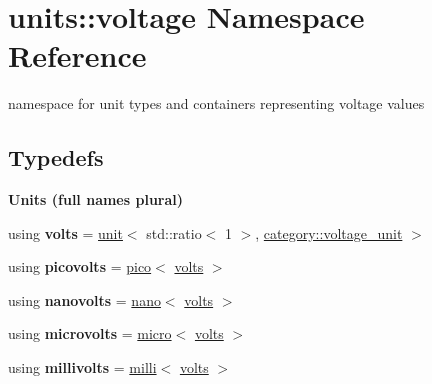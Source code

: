 \hypertarget{namespaceunits_1_1voltage}{}\section{units\+:\+:voltage Namespace Reference}
\label{namespaceunits_1_1voltage}


namespace for unit types and containers representing voltage values  


\subsection*{Typedefs}
\begin{Indent}{\bf Units (full names plural)}\par
\begin{DoxyCompactItemize}
\item 
\hypertarget{namespaceunits_1_1voltage_adbd9a06b5710d75a99702d13573fb1af}{}using {\bfseries volts} = \hyperlink{structunits_1_1unit}{unit}$<$ std\+::ratio$<$ 1 $>$, \hyperlink{namespaceunits_1_1category_aaac5d18aab461c59602bf8f07861d26e}{category\+::voltage\+\_\+unit} $>$\label{namespaceunits_1_1voltage_adbd9a06b5710d75a99702d13573fb1af}

\item 
\hypertarget{namespaceunits_1_1voltage_a30934f2b50c35efb7ee652d176eefb21}{}using {\bfseries picovolts} = \hyperlink{group___unit_manipulators_ga82a8d14a3e0877a375a66b64c45baab9}{pico}$<$ \hyperlink{structunits_1_1unit}{volts} $>$\label{namespaceunits_1_1voltage_a30934f2b50c35efb7ee652d176eefb21}

\item 
\hypertarget{namespaceunits_1_1voltage_a5a7751d72cfc6db625b51e7185881b21}{}using {\bfseries nanovolts} = \hyperlink{group___unit_manipulators_ga1c25c3c1d6c1f3aed3fd1ecf043110d5}{nano}$<$ \hyperlink{structunits_1_1unit}{volts} $>$\label{namespaceunits_1_1voltage_a5a7751d72cfc6db625b51e7185881b21}

\item 
\hypertarget{namespaceunits_1_1voltage_ab0ecad7cf9926495c5bf8058748719d6}{}using {\bfseries microvolts} = \hyperlink{group___unit_manipulators_gaea53c906ec805110b93f02db4a961971}{micro}$<$ \hyperlink{structunits_1_1unit}{volts} $>$\label{namespaceunits_1_1voltage_ab0ecad7cf9926495c5bf8058748719d6}

\item 
\hypertarget{namespaceunits_1_1voltage_a8388444ff7e13b5eba99ae14cff8a6c7}{}using {\bfseries millivolts} = \hyperlink{group___unit_manipulators_gaec9d1c320e180eb59f3cb3094d8079dd}{milli}$<$ \hyperlink{structunits_1_1unit}{volts} $>$\label{namespaceunits_1_1voltage_a8388444ff7e13b5eba99ae14cff8a6c7}


\end{DoxyCompactItemize}
\end{Indent}
